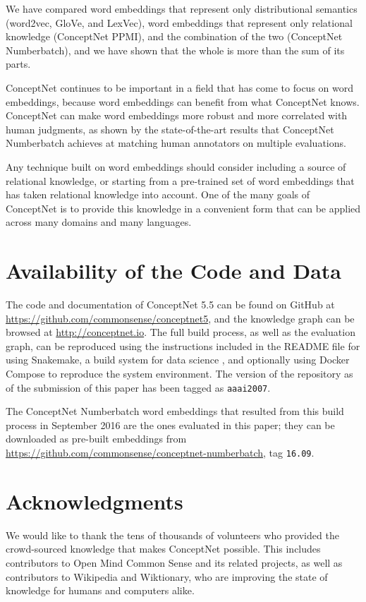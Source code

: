\documentclass[letterpaper]{article}
\begin{document}
We have compared word embeddings that represent only distributional semantics
(word2vec, GloVe, and LexVec), word embeddings that represent only
relational knowledge (ConceptNet PPMI), and the combination of the two
(ConceptNet Numberbatch), and we have shown that the whole is more than the sum
of its parts.

ConceptNet continues to be important in a field that has come to focus on word
embeddings, because word embeddings can benefit from what ConceptNet knows.
ConceptNet can make word embeddings more robust and more correlated with human
judgments, as shown by the state-of-the-art results that ConceptNet Numberbatch
achieves at matching human annotators on multiple evaluations.

Any technique built on word embeddings should
consider including a source of relational knowledge, or starting from a
pre-trained set of word embeddings that has taken relational knowledge into
account. One of the many goals of ConceptNet is to provide this knowledge in a
convenient form that can be applied across many domains and many languages.

\section{Availability of the Code and Data}

The code and documentation of ConceptNet 5.5 can be found on GitHub at
\url{https://github.com/commonsense/conceptnet5}, and the knowledge graph can
be browsed at \url{http://conceptnet.io}.  The full build process, as well as
the evaluation graph, can be reproduced using the instructions included in the
README file for using Snakemake, a build system for data science
\cite{koster2012snakemake}, and optionally using Docker Compose to reproduce
the system environment.  The version of the repository as of the submission of
this paper has been tagged as {\tt aaai2007}.

The ConceptNet Numberbatch word embeddings that resulted from this build
process in September 2016 are the ones evaluated in this paper; they can be
downloaded as pre-built embeddings from
\url{https://github.com/commonsense/conceptnet-numberbatch}, tag {\tt 16.09}.

\section{Acknowledgments}

We would like to thank the tens of thousands of volunteers who provided the
crowd-sourced knowledge that makes ConceptNet possible. This includes
contributors to Open Mind Common Sense and its related projects, as well as
contributors to Wikipedia and Wiktionary, who are improving the state of
knowledge for humans and computers alike.



\end{document}
